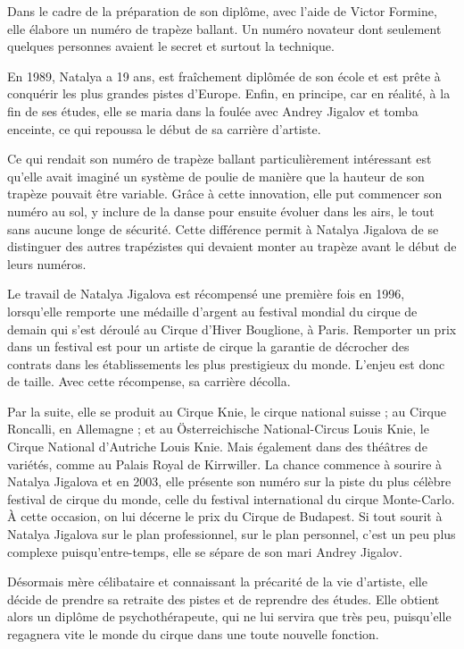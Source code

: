 Dans le cadre de la préparation de son diplôme, avec l’aide de Victor Formine, elle élabore un numéro de trapèze ballant. Un numéro novateur dont seulement quelques personnes avaient le secret et surtout la technique.

En 1989, Natalya a 19 ans, est fraîchement diplômée de son école et est prête à conquérir les plus grandes pistes d’Europe. Enfin, en principe, car en réalité, à la fin de ses études, elle se maria dans la foulée avec Andrey Jigalov et tomba enceinte, ce qui repoussa le début de sa carrière d'artiste. 

Ce qui rendait son numéro de trapèze ballant particulièrement intéressant est qu'elle avait imaginé un système de poulie de manière que la hauteur de son trapèze pouvait être variable. Grâce à cette innovation, elle put commencer son numéro au sol, y inclure de la danse pour ensuite évoluer dans les airs, le tout sans aucune longe de sécurité. Cette différence permit à Natalya Jigalova de se distinguer des autres trapézistes qui devaient monter au trapèze avant le début de leurs numéros.

Le travail de Natalya Jigalova est récompensé une première fois en 1996, lorsqu’elle remporte une médaille d'argent au festival mondial du cirque de demain qui s’est déroulé au Cirque d'Hiver Bouglione, à Paris. Remporter un prix dans un festival est pour un artiste de cirque la garantie de décrocher des contrats dans les établissements les plus prestigieux du monde. L'enjeu est donc de taille. Avec cette récompense, sa carrière décolla.

Par la suite, elle se produit au Cirque Knie, le cirque national suisse ; au Cirque Roncalli, en Allemagne ; et au Österreichische National-Circus Louis Knie, le Cirque National d’Autriche Louis Knie. Mais également dans des théâtres de variétés, comme au Palais Royal de Kirrwiller. La chance commence à sourire à Natalya Jigalova et en 2003, elle présente son numéro sur la piste du plus célèbre festival de cirque du monde, celle du festival international du cirque Monte-Carlo. À cette occasion, on lui décerne le prix du Cirque de Budapest. Si tout sourit à Natalya Jigalova sur le plan professionnel, sur le plan personnel, c'est un peu plus complexe puisqu’entre-temps, elle se sépare de son mari Andrey Jigalov.

Désormais mère célibataire et connaissant la précarité de la vie d’artiste, elle décide de prendre sa retraite des pistes et de reprendre des études. Elle obtient alors un diplôme de psychothérapeute, qui ne lui servira que très peu, puisqu'elle regagnera vite le monde du cirque dans une toute nouvelle fonction.	

